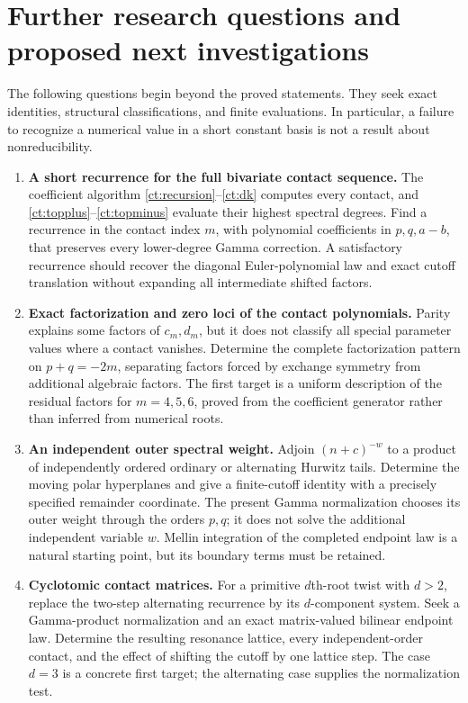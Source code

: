 \section{Further research questions and proposed next investigations}
\label{rq:section}

The following questions begin beyond the proved statements. They seek exact
identities, structural classifications, and finite evaluations. In
particular, a failure to recognize a numerical value in a short constant
basis is not a result about nonreducibility.

\begin{enumerate}[label=\textbf{Q\arabic*.}]
\item \textbf{A short recurrence for the full bivariate contact sequence.}
The coefficient algorithm \eqref{ct:recursion}--\eqref{ct:dk} computes every
contact, and \eqref{ct:topplus}--\eqref{ct:topminus} evaluate their highest
spectral degrees. Find a recurrence in the contact index \(m\), with
polynomial coefficients in \(p,q,a-b\), that preserves every lower-degree
Gamma correction. A satisfactory recurrence should recover the diagonal
Euler-polynomial law and exact cutoff translation without expanding all
intermediate shifted factors.

\item \textbf{Exact factorization and zero loci of the contact polynomials.}
Parity explains some factors of \(c_m,d_m\), but it does not classify all
special parameter values where a contact vanishes. Determine the complete
factorization pattern on \(p+q=-2m\), separating factors forced by exchange
symmetry from additional algebraic factors. The first target is a uniform
description of the residual factors for \(m=4,5,6\), proved from the
coefficient generator rather than inferred from numerical roots.

\item \textbf{An independent outer spectral weight.}
Adjoin \((n+c)^{-w}\) to a product of independently ordered ordinary or
alternating Hurwitz tails. Determine the moving polar hyperplanes and give
a finite-cutoff identity with a precisely specified remainder coordinate.
The present Gamma normalization chooses its outer weight through the
orders \(p,q\); it does not solve the additional independent variable
\(w\). Mellin integration of the completed endpoint law is a natural
starting point, but its boundary terms must be retained.

\item \textbf{Cyclotomic contact matrices.}
For a primitive \(d\)th-root twist with \(d>2\), replace the two-step
alternating recurrence by its \(d\)-component system. Seek a Gamma-product
normalization and an exact matrix-valued bilinear endpoint law. Determine
the resulting resonance lattice, every independent-order contact, and the
effect of shifting the cutoff by one lattice step. The case \(d=3\) is a
concrete first target; the alternating case supplies the normalization test.


\end{enumerate}
